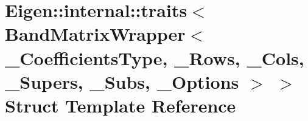 \hypertarget{struct_eigen_1_1internal_1_1traits_3_01_band_matrix_wrapper_3_01___coefficients_type_00_01___row768e2717402a9eceb38d536f65ceb4f1}{}\section{Eigen\+:\+:internal\+:\+:traits$<$ Band\+Matrix\+Wrapper$<$ \+\_\+\+Coefficients\+Type, \+\_\+\+Rows, \+\_\+\+Cols, \+\_\+\+Supers, \+\_\+\+Subs, \+\_\+\+Options $>$ $>$ Struct Template Reference}
\label{struct_eigen_1_1internal_1_1traits_3_01_band_matrix_wrapper_3_01___coefficients_type_00_01___row768e2717402a9eceb38d536f65ceb4f1}
